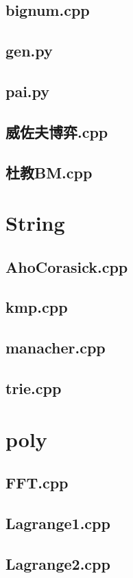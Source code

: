 \subsection{bignum.cpp}

\subsection{gen.py}

\subsection{pai.py}

\subsection{威佐夫博弈.cpp}

\subsection{杜教BM.cpp}

\section{String}
\subsection{AhoCorasick.cpp}

\subsection{kmp.cpp}

\subsection{manacher.cpp}

\subsection{trie.cpp}

\section{poly}
\subsection{FFT.cpp}

\subsection{Lagrange1.cpp}

\subsection{Lagrange2.cpp}

